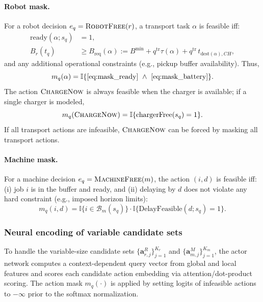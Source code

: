 \documentclass[preprint, 3p, review, 12pt]{elsarticle}
\begin{document}
\paragraph{Robot mask.}
For a robot decision $e_q=\textsc{RobotFree}(r)$, a transport task $\alpha$ is feasible iff:
\begin{align}
\mathrm{ready}(\alpha;s_q) &= 1,
\label{eq:mask_ready}
\\
B_r(t_q) &\ge B_{\mathrm{req}}(\alpha)
:= B^{\min} + q^{\mathrm{tr}}\tau(\alpha) + q^{\mathrm{tr}}\,t_{\mathrm{dest}(\alpha),CH},
\label{eq:mask_battery}
\end{align}
and any additional operational constraints (e.g., pickup buffer availability).
Thus,
\[
m_q(\alpha)=\mathbb{I}\{\eqref{eq:mask_ready}\ \wedge\ \eqref{eq:mask_battery}\}.
\]
The action $\textsc{ChargeNow}$ is always feasible when the charger is available; if a single charger is modeled,
\[
m_q(\textsc{ChargeNow})=\mathbb{I}\{\mathrm{chargerFree}(s_q)=1\}.
\]
If all transport actions are infeasible, $\textsc{ChargeNow}$ can be forced by masking all transport actions.

\paragraph{Machine mask.}
For a machine decision $e_q=\textsc{MachineFree}(m)$, the action $(i,d)$ is feasible iff:
(i) job $i$ is in the buffer and ready, and (ii) delaying by $d$ does not violate any hard constraint (e.g., imposed horizon limits):
\[
m_q(i,d)=\mathbb{I}\{i\in\mathcal{B}_m(s_q)\}\cdot \mathbb{I}\{\mathrm{DelayFeasible}(d;s_q)=1\}.
\]

\subsubsection{Neural encoding of variable candidate sets}
To handle the variable-size candidate sets $\{\mathbf{a}^{R}_{r,j}\}_{j=1}^{K_r}$ and $\{\mathbf{a}^{M}_{m,j}\}_{j=1}^{K_m}$, the actor network computes a context-dependent query vector from global and local features and scores each candidate action embedding via attention/dot-product scoring. The action mask $m_q(\cdot)$ is applied by setting logits of infeasible actions to $-\infty$ prior to the softmax normalization.
\end{document}

